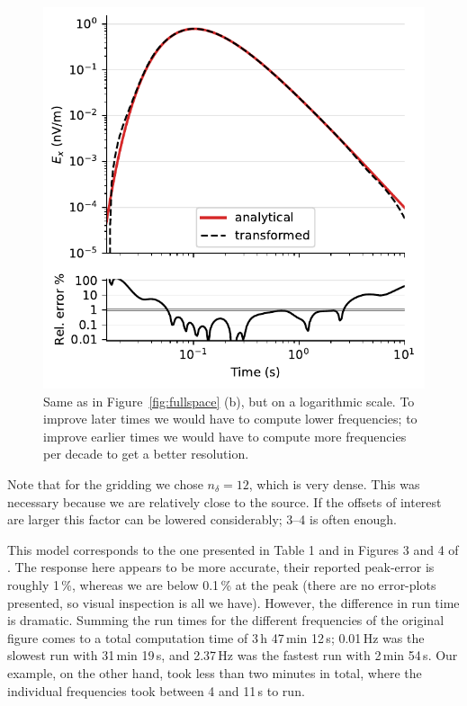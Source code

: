 \documentclass[extra, camera,%
]{gji}
\newlength{\cwidth}
\begin{document}
\begin{figure}
  \centering
  \includegraphics[width=\cwidth]{05-fullspace-log}
  \caption{Same as in Figure~\ref{fig:fullspace} (b), but on a logarithmic
    scale. To improve later times we would have to compute lower frequencies;
    to improve earlier times we would have to compute more frequencies per
    decade to get a better resolution.}
  \label{fig:fullspace-log}
\end{figure}
%
Note that for the gridding we chose $n_\delta=12$, which is very dense. This
was necessary because we are relatively close to the source. If the offsets of
interest are larger this factor can be lowered considerably; 3--4 is often
enough.

This model corresponds to the one presented in Table 1 and in Figures 3 and 4
of \cite{GEO.08.Mulder}. The response here appears to be more accurate, their
reported peak-error is roughly 1\,\%, whereas we are below 0.1\,\% at the peak
(there are no error-plots presented, so visual inspection is all we have).
However, the difference in run time is dramatic. Summing the run times for the
different frequencies of the original figure comes to a total computation time
of 3\,h 47\,min 12\,s; 0.01\,Hz was the slowest run with 31\,min 19\,s, and
2.37\,Hz was the fastest run with 2\,min 54\,s. Our example, on the other hand,
took less than two minutes in total, where the individual frequencies took
between 4 and 11\,s to run.
\end{document}
